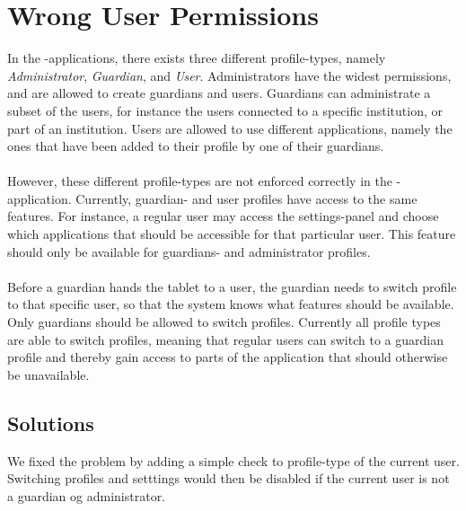 \section{Wrong User Permissions}
\label{sec:wrong_user_permissions}

In the \giraf-applications, there exists three different profile-types, namely \emph{Administrator}, \emph{Guardian}, and \emph{User}. Administrators have the widest permissions, and are allowed to create guardians and users. Guardians can administrate a subset of the users, for instance the users connected to a specific institution, or part of an institution. Users are allowed to use different applications, namely the ones that have been added to their profile by one of their guardians. 
\\\\
However, these different profile-types are not enforced correctly in the \launcher-application. Currently, guardian- and user profiles have access to the same features. For instance, a regular user may access the settings-panel and choose which applications that should be accessible for that particular user. This feature should only be available for guardians- and administrator profiles.
\\\\
Before a guardian hands the tablet to a user, the guardian needs to switch profile to that specific user, so that the system knows what features should be available. Only guardians should be allowed to switch profiles. Currently all profile types are able to switch profiles, meaning that regular users can switch to a guardian profile and thereby gain access to parts of the application that should otherwise be unavailable.

\subsection{Solutions}
\label{sub:wrong_user_permissions_solutions}

We fixed the problem by adding a simple check to profile-type of the current user. Switching profiles and setttings would then be disabled if the current user is not a guardian og administrator.